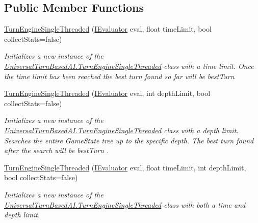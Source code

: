\subsection*{Public Member Functions}
\begin{DoxyCompactItemize}
\item 
\hyperlink{class_universal_turn_based_a_i_1_1_turn_engine_single_threaded_a4b4e3d37f9646bf0f5bceb64d1ea560b}{Turn\+Engine\+Single\+Threaded} (\hyperlink{interface_universal_turn_based_a_i_1_1_i_evaluator}{I\+Evaluator} eval, float time\+Limit, bool collect\+Stats=false)
\begin{DoxyCompactList}\small\item\em Initializes a new instance of the \hyperlink{class_universal_turn_based_a_i_1_1_turn_engine_single_threaded}{Universal\+Turn\+Based\+A\+I.\+Turn\+Engine\+Single\+Threaded} class with a time limit. Once the time limit has been reached the best turn found so far will be {\itshape best\+Turn}  \end{DoxyCompactList}\item 
\hyperlink{class_universal_turn_based_a_i_1_1_turn_engine_single_threaded_a85a136e7e4a46bb4ff5283b2a1b7da8e}{Turn\+Engine\+Single\+Threaded} (\hyperlink{interface_universal_turn_based_a_i_1_1_i_evaluator}{I\+Evaluator} eval, int depth\+Limit, bool collect\+Stats=false)
\begin{DoxyCompactList}\small\item\em Initializes a new instance of the \hyperlink{class_universal_turn_based_a_i_1_1_turn_engine_single_threaded}{Universal\+Turn\+Based\+A\+I.\+Turn\+Engine\+Single\+Threaded} class with a depth limit. Searches the entire Game\+State tree up to the specific depth. The best turn found after the search will be {\itshape best\+Turn} . \end{DoxyCompactList}\item 
\hyperlink{class_universal_turn_based_a_i_1_1_turn_engine_single_threaded_abb6589d9134a6a427d07d43319e54823}{Turn\+Engine\+Single\+Threaded} (\hyperlink{interface_universal_turn_based_a_i_1_1_i_evaluator}{I\+Evaluator} eval, float time\+Limit, int depth\+Limit, bool collect\+Stats=false)
\begin{DoxyCompactList}\small\item\em Initializes a new instance of the \hyperlink{class_universal_turn_based_a_i_1_1_turn_engine_single_threaded}{Universal\+Turn\+Based\+A\+I.\+Turn\+Engine\+Single\+Threaded} class with both a time and depth limit. \end{DoxyCompactList}\end{DoxyCompactItemize}
